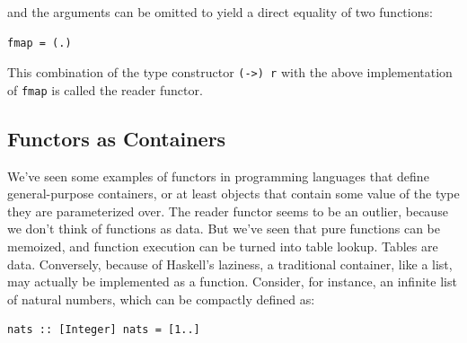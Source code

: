 and the arguments can be omitted to yield a direct equality of two
functions:

\begin{verbatim}
fmap = (.)
\end{verbatim}

This combination of the type constructor \texttt{(-\textgreater{})\ r}
with the above implementation of \texttt{fmap} is called the reader
functor.

\subsection{Functors as Containers}\label{functors-as-containers}

We've seen some examples of functors in programming languages that
define general-purpose containers, or at least objects that contain some
value of the type they are parameterized over. The reader functor seems
to be an outlier, because we don't think of functions as data. But we've
seen that pure functions can be memoized, and function execution can be
turned into table lookup. Tables are data. Conversely, because of
Haskell's laziness, a traditional container, like a list, may actually
be implemented as a function. Consider, for instance, an infinite list
of natural numbers, which can be compactly defined as:

\begin{verbatim}
nats :: [Integer] nats = [1..]
\end{verbatim}

